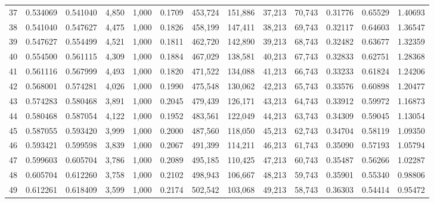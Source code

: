 \begin{tabular}{rrrrrrrrrrrrr}
37  &  0.534069 &  0.541040 &   4,850 &  1,000 &                                     0.1709 &  453,724 &  151,886 &   37,213 &   70,743 &  0.31776 &  0.65529 &  1.40693 \\
38  &  0.541040 &  0.547627 &   4,475 &  1,000 &                                     0.1826 &  458,199 &  147,411 &   38,213 &   69,743 &  0.32117 &  0.64603 &  1.36547 \\
39  &  0.547627 &  0.554499 &   4,521 &  1,000 &                                     0.1811 &  462,720 &  142,890 &   39,213 &   68,743 &  0.32482 &  0.63677 &  1.32359 \\
40  &  0.554500 &  0.561115 &   4,309 &  1,000 &                                     0.1884 &  467,029 &  138,581 &   40,213 &   67,743 &  0.32833 &  0.62751 &  1.28368 \\
41  &  0.561116 &  0.567999 &   4,493 &  1,000 &                                     0.1820 &  471,522 &  134,088 &   41,213 &   66,743 &  0.33233 &  0.61824 &  1.24206 \\
42  &  0.568001 &  0.574281 &   4,026 &  1,000 &                                     0.1990 &  475,548 &  130,062 &   42,213 &   65,743 &  0.33576 &  0.60898 &  1.20477 \\
43  &  0.574283 &  0.580468 &   3,891 &  1,000 &                                     0.2045 &  479,439 &  126,171 &   43,213 &   64,743 &  0.33912 &  0.59972 &  1.16873 \\
44  &  0.580468 &  0.587054 &   4,122 &  1,000 &                                     0.1952 &  483,561 &  122,049 &   44,213 &   63,743 &  0.34309 &  0.59045 &  1.13054 \\
45  &  0.587055 &  0.593420 &   3,999 &  1,000 &                                     0.2000 &  487,560 &  118,050 &   45,213 &   62,743 &  0.34704 &  0.58119 &  1.09350 \\
46  &  0.593421 &  0.599598 &   3,839 &  1,000 &                                     0.2067 &  491,399 &  114,211 &   46,213 &   61,743 &  0.35090 &  0.57193 &  1.05794 \\
47  &  0.599603 &  0.605704 &   3,786 &  1,000 &                                     0.2089 &  495,185 &  110,425 &   47,213 &   60,743 &  0.35487 &  0.56266 &  1.02287 \\
48  &  0.605704 &  0.612260 &   3,758 &  1,000 &                                     0.2102 &  498,943 &  106,667 &   48,213 &   59,743 &  0.35901 &  0.55340 &  0.98806 \\
49  &  0.612261 &  0.618409 &   3,599 &  1,000 &                                     0.2174 &  502,542 &  103,068 &   49,213 &   58,743 &  0.36303 &  0.54414 &  0.95472 \\

\end{tabular}
